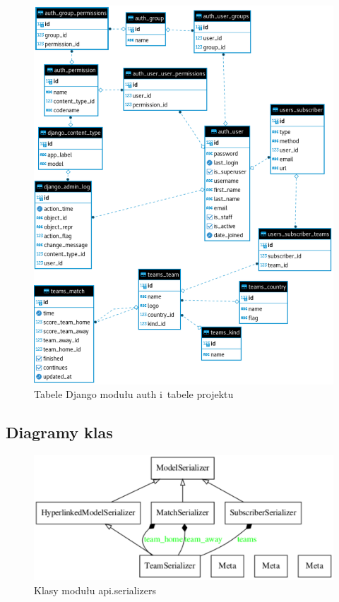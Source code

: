 \documentclass[11pt,a4paper]{article}
\begin{document}
    \newpage
    \begin{figure}[!h]
        \begin{center}
            \includegraphics[width=\textwidth]{images/all_tables.pdf}
        \end{center}
        \caption{Tabele Django modułu auth i~tabele projektu}
    \end{figure}

    \newpage

    \subsection{Diagramy klas}

    \begin{figure}[!h]
        \begin{center}
            \includegraphics[width=\textwidth]{images/classes_api_serializers.pdf}
        \end{center}
        \caption{Klasy modułu api.serializers}
    \end{figure}
\end{document}
